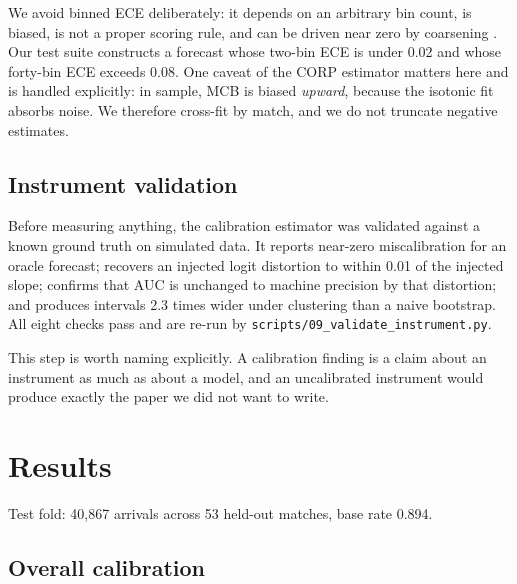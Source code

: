 \documentclass[11pt,a4paper]{article}
\begin{document}
We avoid binned ECE deliberately: it depends on an arbitrary bin count, is
biased, is not a proper scoring rule, and can be driven near zero by coarsening
\citep{nixon2019measuring, kumar2019verified}. Our test suite constructs a
forecast whose two-bin ECE is under 0.02 and whose forty-bin ECE exceeds 0.08.
One caveat of the CORP estimator matters here and is handled explicitly: in
sample, MCB is biased \emph{upward}, because the isotonic fit absorbs noise. We
therefore cross-fit by match, and we do not truncate negative estimates.


\subsection{Instrument validation}

Before measuring anything, the calibration estimator was validated against a
known ground truth on simulated data. It reports near-zero miscalibration for an
oracle forecast; recovers an injected logit distortion to within 0.01 of the
injected slope; confirms that AUC is unchanged to machine precision by that
distortion; and produces intervals 2.3 times wider under clustering than a naive
bootstrap. All eight checks pass and are re-run by
\texttt{scripts/09\_validate\_instrument.py}.

This step is worth naming explicitly. A calibration finding is a claim about an
instrument as much as about a model, and an uncalibrated instrument would produce
exactly the paper we did not want to write.

\section{Results}

Test fold: 40{,}867 arrivals across 53 held-out matches, base rate 0.894.

\subsection{Overall calibration}
\end{document}
